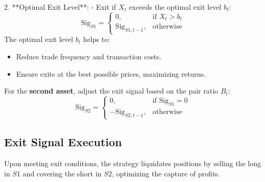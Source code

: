 \documentclass{article}
\begin{document}
2. **Optimal Exit Level**:
    - Exit if \( X_t \) exceeds the optimal exit level \( b_t \):
    \[
    \text{Sig}_{S1} = 
    \begin{cases} 
    0, & \text{if } X_t > b_t \\
    \text{Sig}_{S1, t-1}, & \text{otherwise}
    \end{cases}
    \]
The optimal exit level \( b_t \) helps to:
\begin{itemize}

    \item Reduce trade frequency and transaction costs.
    \item Ensure exits at the best possible prices, maximizing returns.
\end{itemize}\vspace{1em}

For the \textbf{second asset}, adjust the exit signal based on the pair ratio \( B_t \):
\[
\text{Sig}_{S2} = 
\begin{cases} 
0, & \text{if } \text{Sig}_{S1} = 0 \\
-\text{Sig}_{S2, t-1}, & \text{otherwise}
\end{cases}
\]


\subsection*{Exit Signal Execution}

Upon meeting exit conditions, the strategy liquidates positions by selling the long in \( S1 \) and covering the short in \( S2 \), optimizing the capture of profits.
\end{document}

